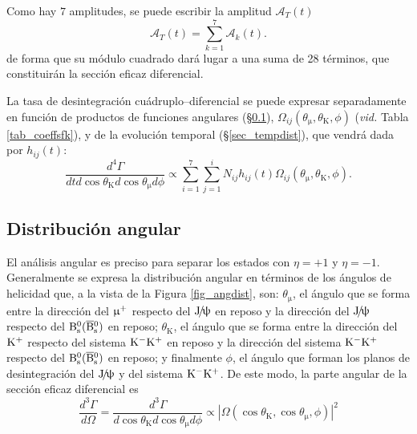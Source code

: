 Como hay $7$ amplitudes, se puede escribir la amplitud $\mathcal{A}_T(t)$
\begin{equation}
\mathcal{A}_T(t) = \sum_{k=1}^{7} \mathcal{A}_k (t).	
\end{equation}
de forma que su módulo cuadrado dará lugar a una suma de 28 términos, que constituirán la sección eficaz diferencial. 

La tasa de desintegración cuádruplo--diferencial se puede expresar separadamente en función de productos de funciones angulares (\S \ref{sec_angdist}), $\Omega_{ij}(\theta_{\upmu},\theta_{\text{K}},\phi)$ (\emph{vid.} Tabla \ref{tab_coeffsfk}), y de la evolución temporal (\S \ref{sec_tempdist}), que vendrá dada por $h_{ij}(t)$:
%
\begin{equation}
\frac{d^4 \Gamma}{dt d\cos\theta_{\text{K}} d\cos\theta_{\upmu} d\phi} \propto \sum_{i=1}^{7}  \sum_{j=1}^i N_{ij} h_{ij}(t) \Omega_{ij}(\theta_{\upmu},\theta_{\text{K}},\phi).
\end{equation}


\subsection{Distribución angular} %
\label{sec_angdist}

El análisis angular es preciso para separar los estados con $\eta = +1$ y $\eta = -1$.
Generalmente se expresa la distribución angular en términos de los ángulos de helicidad que, a la vista de la Figura \ref{fig_angdist}, son: $\theta_{\upmu}$, el ángulo que se forma entre la dirección del $\upmu{}^{+}$ respecto del $\text{J}\!/\!\uppsi$ en reposo y la dirección del $\text{J}\!/\!\uppsi$ respecto del $\text{B}{}_{\text{s}}^{0}(\overline{\text{B}}{}_{\text{s}}^{0})$ en reposo; $\theta_{\text{K}}$, el ángulo que se forma entre la dirección del $\text{K}{}^{+}$ respecto del sistema $\text{K}{}^{-} \text{K}{}^{+}$ en reposo y la dirección del sistema $\text{K}{}^{-} \text{K}{}^{+}$ respecto del $\text{B}{}_{\text{s}}^{0}(\overline{\text{B}}{}_{\text{s}}^{0})$ en reposo; y finalmente $\phi$, el ángulo que forman los planos de desintegración del $\text{J}\!/\!\uppsi$ y del sistema $\text{K}{}^{-} \text{K}{}^{+}$.
%
De este modo, la parte angular de la sección eficaz diferencial es
\begin{equation}
\frac{d^3 \Gamma}{d \Omega} = \frac{d^3 \Gamma}{d \cos\theta_{\text{K}} d\cos\theta_{\upmu} d\phi}	\propto |\Omega(\cos\theta_{\text{K}} ,\cos\theta_{\upmu} ,\phi) |^2
\end{equation}


